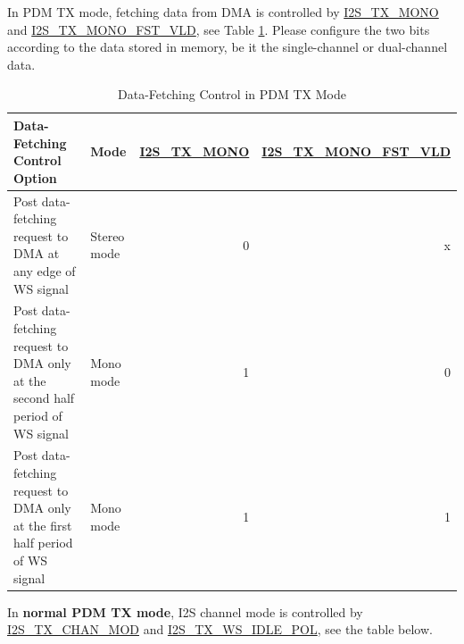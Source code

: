 \documentclass[main\_\_EN.tex]{subfiles}
\begin{document}
In PDM TX mode, fetching data from DMA is controlled by \hyperref[fielddesc:I2STXMONO]{I2S\_TX\_MONO} and \hyperref[fielddesc:I2STXMONOFSTVLD]{I2S\_TX\_MONO\_FST\_VLD}, see Table \ref{tab:i2s-data-fetch-control-pdm-mode}. Please configure the two bits according to the data stored in memory, be it the single-channel or dual-channel data. 
\begin{table}[H]
    \centering
    \caption{Data-Fetching Control in PDM TX Mode}
    \label{tab:i2s-data-fetch-control-pdm-mode}
    \begin{tabular}{|p{6.6cm}|l|r|r|}
    \hline
    \rowcolor{lightgray}
    \textbf{Data-Fetching Control Option} &\textbf{Mode} &\textbf{\hyperref[fielddesc:I2STXMONO]{I2S\_TX\_MONO}}  & \textbf{\hyperref[fielddesc:I2STXMONOFSTVLD]{I2S\_TX\_MONO\_FST\_VLD}} \\ \hline
                        Post data-fetching request to DMA at any edge of WS signal & Stereo mode & 0 & x        \\ \hline
                        Post data-fetching request to DMA only at the second half period of WS signal  & Mono mode & 1 & 0   \\ \hline
                        Post data-fetching request to DMA only at the first half period of WS signal & Mono mode & 1 & 1      \\ \hline
    \end{tabular}
\end{table}
In \textbf{normal PDM TX mode}, I2S channel mode is controlled by  \hyperref[fielddesc:I2Ssec:i2s-tx-dataMOD]{I2S\_TX\_CHAN\_MOD} and  \hyperref[fielddesc:I2STXWSIDLEPOL]{I2S\_TX\_WS\_IDLE\_POL}, see the table below. 
\end{document}
